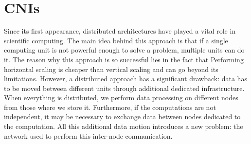 \chapter{CNIs}\label{chpt:cni}


\label{sec:network}


Since its first appearance, distributed architectures have played a vital role
in scientific computing. The main idea behind this approach is that if a single
computing unit is not powerful enough to solve a problem, multiple units can do
it. The reason why this approach is so successful lies in the fact that
Performing horizontal scaling is cheaper than vertical scaling and can go beyond
its limitations. However, a distributed approach has a significant drawback:
data has to be moved between different units through additional dedicated
infrastructure. When everything is distributed, we perform data processing on
different nodes from those where we store it. Furthermore, if the computations
are not independent, it may be necessary to exchange data between nodes
dedicated to the computation. All this additional data motion introduces a new
problem: the network used to perform this inter-node communication.



